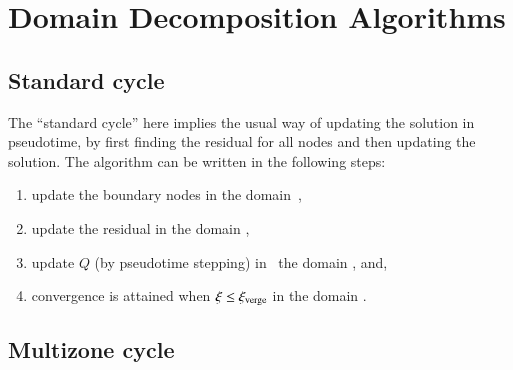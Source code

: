 \section{Domain Decomposition Algorithms}

\subsection{Standard cycle}

The ``standard cycle'' here implies the usual way of updating the solution
in pseudotime, by first finding the residual for all nodes and then updating
the solution. The algorithm can be written in the following steps:
%
\begin{enumerate}
  \item{update the boundary nodes in the domain\
        ,}
  \item{update the residual in the domain
        , }
  \item{update $Q$ (by pseudotime stepping) in \
        the domain , and,}
  \item{convergence is attained when $\xi \leq {\xi_{\rm verge}}$ in the domain .}
\end{enumerate}
%



\subsection{Multizone cycle}
\label{section:multizone}

